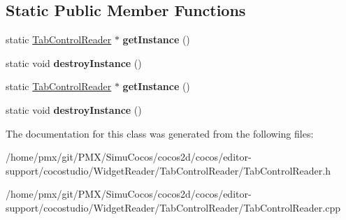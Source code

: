 \subsection*{Static Public Member Functions}
\begin{DoxyCompactItemize}
\item 
\mbox{\label{classTabControlReader_a6433211be4dfef585115fd8814321147}} 
static \hyperlink{classTabControlReader}{Tab\+Control\+Reader} $\ast$ {\bfseries get\+Instance} ()
\item 
\mbox{\label{classTabControlReader_a9b8931be464816f9a8283564e8cc3f94}} 
static void {\bfseries destroy\+Instance} ()
\item 
\mbox{\label{classTabControlReader_aa6d43a499fde679aac30ede7f80f5519}} 
static \hyperlink{classTabControlReader}{Tab\+Control\+Reader} $\ast$ {\bfseries get\+Instance} ()
\item 
\mbox{\label{classTabControlReader_a637e9044d94aa139d6b5153294e0c71c}} 
static void {\bfseries destroy\+Instance} ()
\end{DoxyCompactItemize}


The documentation for this class was generated from the following files\+:\begin{DoxyCompactItemize}
\item 
/home/pmx/git/\+P\+M\+X/\+Simu\+Cocos/cocos2d/cocos/editor-\/support/cocostudio/\+Widget\+Reader/\+Tab\+Control\+Reader/Tab\+Control\+Reader.\+h\item 
/home/pmx/git/\+P\+M\+X/\+Simu\+Cocos/cocos2d/cocos/editor-\/support/cocostudio/\+Widget\+Reader/\+Tab\+Control\+Reader/Tab\+Control\+Reader.\+cpp\end{DoxyCompactItemize}
